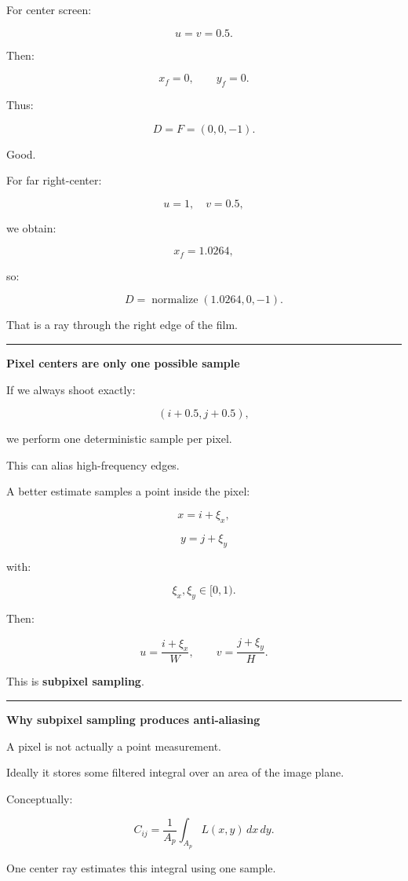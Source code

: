 For center screen:

\[
u=v=0.5.
\]

Then:

\[
x_f=0,
\qquad
y_f=0.
\]

Thus:

\[
D=F=(0,0,-1).
\]

Good.

For far right-center:

\[
u=1,
\quad
v=0.5,
\]

we obtain:

\[
x_f=1.0264,
\]

so:

\[
D
=
\operatorname{normalize}
(1.0264,0,-1).
\]

That is a ray through the right edge of the film.

\begin{center}\rule{0.5\linewidth}{0.5pt}\end{center}

\textbf{Pixel centers are only one possible sample}

If we always shoot exactly:

\[
(i+0.5,j+0.5),
\]

we perform one deterministic sample per pixel.

This can alias high-frequency edges.

A better estimate samples a point inside the pixel:

\[
x=i+\xi_x,
\]

\[
y=j+\xi_y
\]

with:

\[
\xi_x,\xi_y\in[0,1).
\]

Then:

\[
u=
\frac{i+\xi_x}{W},
\qquad
v=
\frac{j+\xi_y}{H}.
\]

This is \textbf{subpixel sampling}.

\begin{center}\rule{0.5\linewidth}{0.5pt}\end{center}

\textbf{Why subpixel sampling produces anti-aliasing}

A pixel is not actually a point measurement.

Ideally it stores some filtered integral over an area of the image plane.

Conceptually:

\[
C_{ij}
=
\frac{1}{A_p}
\int_{A_p}
L(x,y)
\,dx\,dy.
\]

One center ray estimates this integral using one sample.


